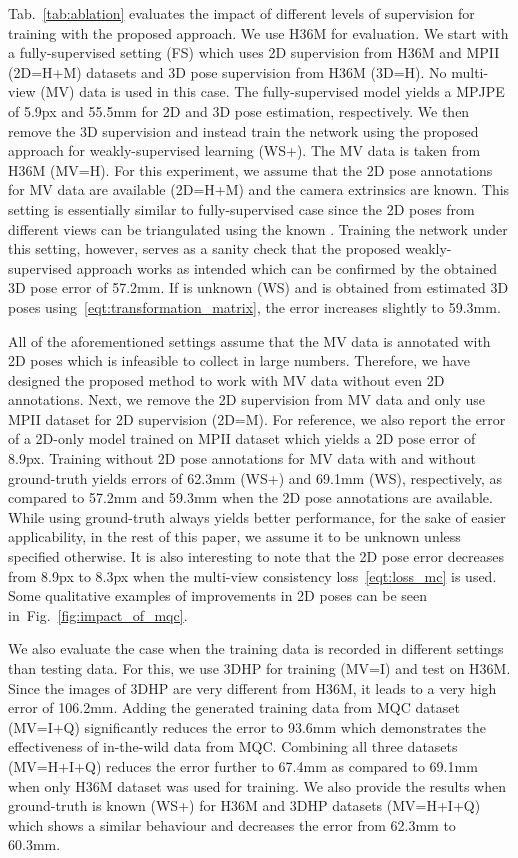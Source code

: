 Tab.~\ref{tab:ablation} evaluates the impact of different levels of supervision for training with the proposed approach. We use  H36M for evaluation. We start with a fully-supervised setting (FS) which uses 2D supervision from H36M and MPII (2D=H+M) datasets and 3D pose supervision from H36M (3D=H). No multi-view (MV) data is used in this case. The fully-supervised model yields a MPJPE of 5.9px  and 55.5mm for 2D and 3D pose estimation, respectively. We then remove the 3D supervision and instead train the network using the proposed approach for weakly-supervised learning (WS+). The MV data is taken from H36M (MV=H). For this experiment, we assume that the 2D pose annotations for MV data are available (2D=H+M) and the camera extrinsics  are known. This setting is essentially similar to fully-supervised case since the 2D poses from different views can be triangulated using the known . Training the network under this setting, however, serves as a sanity check that the proposed weakly-supervised approach works as intended which can be confirmed by the obtained 3D pose error of 57.2mm.  If  is unknown (WS) and is obtained from estimated 3D poses using~\eqref{eqt:transformation_matrix}, the error increases slightly to 59.3mm. 

All of the aforementioned settings assume that the MV data is annotated with 2D poses which is infeasible to collect in large numbers. Therefore, we have designed the proposed method to work with MV data without even 2D annotations. Next, we remove the 2D supervision from MV data and only use MPII dataset for 2D supervision (2D=M). For reference, we also report the error of a 2D-only model trained on MPII dataset which yields a 2D pose error of 8.9px. 
Training without 2D pose annotations for MV data with and without ground-truth  yields errors of 62.3mm (WS+) and 69.1mm (WS), respectively, as compared to 57.2mm and 59.3mm when the 2D pose annotations are available. While using ground-truth  always yields better performance, for the sake of easier applicability, in the rest of this paper, we assume it to be unknown unless specified otherwise. It is also interesting to note that the 2D pose error decreases from 8.9px to 8.3px when the multi-view consistency loss~\eqref{eqt:loss_mc} is used. Some qualitative examples of improvements in 2D poses can be seen in~Fig.~\ref{fig:impact_of_mqc}.  

We also evaluate the case when the training data is recorded in different settings than testing data. For this, we use 3DHP for training (MV=I) and test on H36M. Since the images of 3DHP are very different from H36M, it leads to a very high error of 106.2mm. Adding the generated training data from MQC dataset (MV=I+Q) significantly reduces the error to 93.6mm which demonstrates the effectiveness of in-the-wild data from MQC. Combining all three datasets (MV=H+I+Q) reduces the error further to 67.4mm as compared to 69.1mm when only H36M dataset was used for training. We also provide the results when ground-truth  is known (WS+) for H36M and 3DHP datasets (MV=H+I+Q) which shows a similar behaviour and decreases the error from 62.3mm to 60.3mm. 

